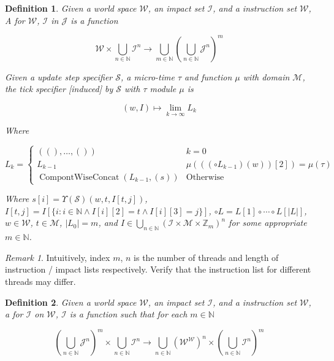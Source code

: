\documentclass{book}
\newtheorem{definition}{Definition}
\theoremstyle{definition}\newtheorem{mechanism}{Mechanism}
\theoremstyle{remark}\newtheorem*{remark}{Remark}
\begin{document}
\begin{definition}
	Given a world space $\mathcal W$, an impact set $\mathcal I$, and a instruction set $\mathcal W$, A  for $\mathcal W$, $\mathcal I$ in $\mathcal J$ is a function
	
	\begin{equation*}
		\mathcal W \times \bigcup_{n \in \mathbb N} \mathcal I^n \to \bigcup_{m \in \mathbb N} \left(\bigcup_{n \in \mathbb N} \mathcal J^n\right)^m
	\end{equation*}
	
	Given a update step specifier $\mathcal S$, a micro-time $\tau$ and function $\mu$ with domain $\mathcal M$, the tick specifier [induced] by $\mathcal S$ with  $\tau$ module $\mu$ is
	
	\begin{equation*}
		(w, I) \mapsto \lim_{k\to \infty} L_k
	\end{equation*}
	
	Where
	
	\begin{equation*}
		L_k = \begin{cases}
			((), \dots, ()) & k = 0\\
			L_{k - 1} & \mu(((\circ L_{k - 1})(w))[2]) = \mu(\tau)\\
			\operatorname{CompontWiseConcat}(L_{k - 1}, (s)) & \text{Otherwise}
		\end{cases}
	\end{equation*}
	
	Where $s[i] = \Upsilon(\mathcal S)(w, t, I[t, j])$, $I[t, j] = I[\{i:i\in \mathbb N \land I[i][2] = t\land I[i][3] = j\}]$, $\circ L = L[1] \circ \cdots \circ L[|L|]$, $w\in \mathcal W$, $t\in \mathcal M$, $|L_0| = m$, and $I \in \bigcup_{n \in \mathbb N} \left(\mathcal I\times \mathcal M\times \mathbb Z_{m}\right)^n$ for some appropriate $m\in\mathbb N$.
\end{definition}

\begin{remark}
	Intuitively, index $m$, $n$ is the number of threads and length of instruction / impact lists respectively. Verify that the instruction list for different threads may differ.
\end{remark}

\begin{definition}
	Given a world space $\mathcal W$, an impact set $\mathcal I$, and a instruction set $\mathcal W$, a  for $\mathcal I$ on $\mathcal W$, $\mathcal I$ is a function such that for each $m\in \mathbb N$
	
	\begin{equation*}
		\left(\bigcup_{n \in \mathbb N} \mathcal J^n\right)^m \times \bigcup_{n \in \mathbb N} \mathcal I^n \to \bigcup_{n \in \mathbb N} \left(\mathcal W^{\mathcal W}\right)^n \times \left(\bigcup_{n \in \mathbb N} \mathcal I^n\right)^m
	\end{equation*}
\end{definition}
\end{document}
